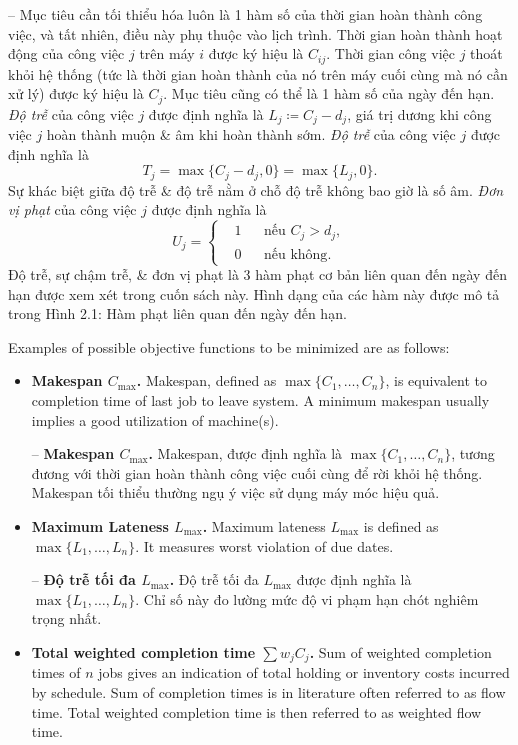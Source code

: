\documentclass{article}
\begin{document}
\begin{itemize}
\begin{itemize}
        -- Mục tiêu cần tối thiểu hóa luôn là 1 hàm số của thời gian hoàn thành công việc, và tất nhiên, điều này phụ thuộc vào lịch trình. Thời gian hoàn thành hoạt động của công việc $j$ trên máy $i$ được ký hiệu là $C_{ij}$. Thời gian công việc $j$ thoát khỏi hệ thống (tức là thời gian hoàn thành của nó trên máy cuối cùng mà nó cần xử lý) được ký hiệu là $C_j$. Mục tiêu cũng có thể là 1 hàm số của ngày đến hạn. {\it Độ trễ} của công việc $j$ được định nghĩa là $L_j\coloneqq C_j - d_j$, giá trị dương khi công việc $j$ hoàn thành muộn \& âm khi hoàn thành sớm. {\it Độ trễ} của công việc $j$ được định nghĩa là
        \begin{equation*}
            T_j = \max\{C_j - d_j,0\} = \max\{L_j,0\}.
        \end{equation*}
        Sự khác biệt giữa độ trễ \& độ trễ nằm ở chỗ độ trễ không bao giờ là số âm. {\it Đơn vị phạt} của công việc $j$ được định nghĩa là
        \begin{equation*}
            U_j = \left\{\begin{split}
                &1&&\mbox{nếu } C_j > d_j,\\
                &0&&\mbox{nếu không}.
            \end{split}\right.
        \end{equation*}
        Độ trễ, sự chậm trễ, \& đơn vị phạt là 3 hàm phạt cơ bản liên quan đến ngày đến hạn được xem xét trong cuốn sách này. Hình dạng của các hàm này được mô tả trong {\sf Hình 2.1: Hàm phạt liên quan đến ngày đến hạn}.

        Examples of possible objective functions to be minimized are as follows:
        \begin{itemize}
            \item {\bf Makespan $C_{\max}$.} Makespan, defined as $\max\{C_1,\ldots,C_n\}$, is equivalent to completion time of last job to leave system. A minimum makespan usually implies a good utilization of machine(s).

            -- {\bf Makespan $C_{\max}$.} Makespan, được định nghĩa là $\max\{C_1,\ldots,C_n\}$, tương đương với thời gian hoàn thành công việc cuối cùng để rời khỏi hệ thống. Makespan tối thiểu thường ngụ ý việc sử dụng máy móc hiệu quả.
            \item {\bf Maximum Lateness $L_{\max}$.} Maximum lateness $L_{\max}$ is defined as $\max\{L_1,\ldots,L_n\}$. It measures worst violation of due dates.

            -- {\bf Độ trễ tối đa $L_{\max}$.} Độ trễ tối đa $L_{\max}$ được định nghĩa là $\max\{L_1,\ldots,L_n\}$. Chỉ số này đo lường mức độ vi phạm hạn chót nghiêm trọng nhất.
            \item {\bf Total weighted completion time $\sum w_jC_j$.} Sum of weighted completion times of $n$ jobs gives an indication of total holding or inventory costs incurred by schedule. Sum of completion times is in literature often referred to as flow time. Total weighted completion time is then referred to as weighted flow time.


\end{itemize}
\end{itemize}
\end{itemize}
\end{document}
